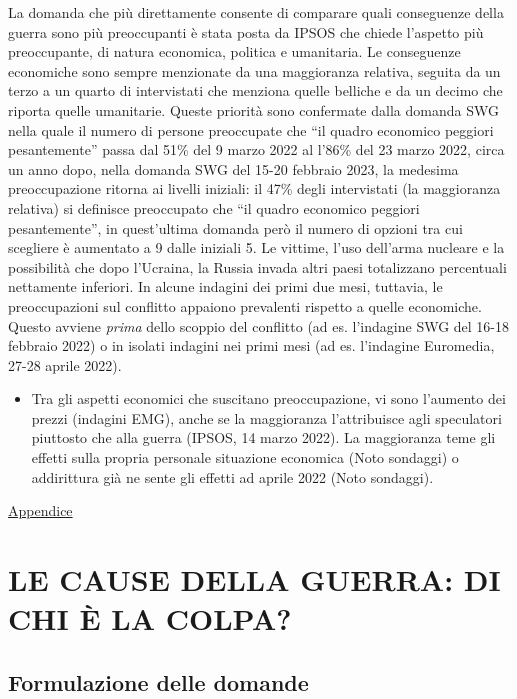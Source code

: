 \documentclass[
  openany]{book}
\providecommand{\tightlist}{%
  \setlength{\itemsep}{0pt}\setlength{\parskip}{0pt}}
\begin{document}
La domanda che più direttamente consente di comparare quali conseguenze della guerra sono più preoccupanti è stata posta da IPSOS che chiede l'aspetto più preoccupante, di natura economica, politica e umanitaria. Le conseguenze economiche sono sempre menzionate da una maggioranza relativa, seguita da un terzo a un quarto di intervistati che menziona quelle belliche e da un decimo che riporta quelle umanitarie. Queste priorità sono confermate dalla domanda SWG nella quale il numero di persone preoccupate che ``il quadro economico peggiori pesantemente'' passa dal 51\% del 9 marzo 2022 al l'86\% del 23 marzo 2022, circa un anno dopo, nella domanda SWG del 15-20 febbraio 2023, la medesima preoccupazione ritorna ai livelli iniziali: il 47\% degli intervistati (la maggioranza relativa) si definisce preoccupato che ``il quadro economico peggiori pesantemente'', in quest'ultima domanda però il numero di opzioni tra cui scegliere è aumentato a 9 dalle iniziali 5. Le vittime, l'uso dell'arma nucleare e la possibilità che dopo l'Ucraina, la Russia invada altri paesi totalizzano percentuali nettamente inferiori. In alcune indagini dei primi due mesi, tuttavia, le preoccupazioni sul conflitto appaiono prevalenti rispetto a quelle economiche. Questo avviene \emph{prima} dello scoppio del conflitto (ad es. l'indagine SWG del 16-18 febbraio 2022) o in isolati indagini nei primi mesi (ad es. l'indagine Euromedia, 27-28 aprile 2022).

\begin{itemize}
\tightlist
\item
  Tra gli aspetti economici che suscitano preoccupazione, vi sono l'aumento dei prezzi (indagini EMG), anche se la maggioranza l'attribuisce agli speculatori piuttosto che alla guerra (IPSOS, 14 marzo 2022). La maggioranza teme gli effetti sulla propria personale situazione economica (Noto sondaggi) o addirittura già ne sente gli effetti ad aprile 2022 (Noto sondaggi).
\end{itemize}

\href{https://github.com/LucianaFazio/Ucrania/blob/main/PDF_Appendice/II\%20Preoccupazioni\%20Ucraina\%20v.6.pdf}{Appendice}

\hypertarget{le-cause-della-guerra-di-chi-uxe8-la-colpa}{%
\chapter{LE CAUSE DELLA GUERRA: DI CHI È LA COLPA?}\label{le-cause-della-guerra-di-chi-uxe8-la-colpa}}

\hypertarget{formulazione-delle-domande-1}{%
\section{Formulazione delle domande}\label{formulazione-delle-domande-1}}
\end{document}
